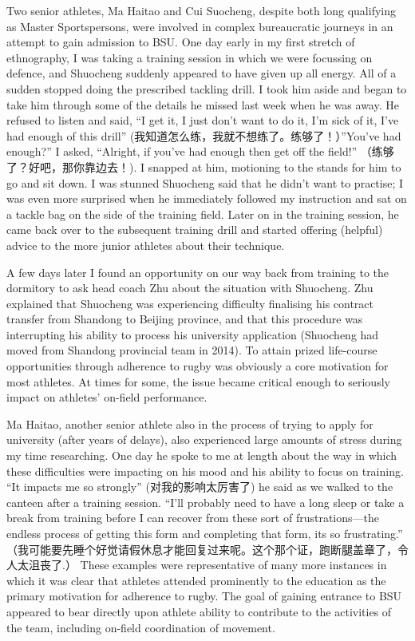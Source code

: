 \begin{CJK}{UTF8}{gbsn}
Two senior athletes, Ma Haitao and Cui Suocheng, despite both long qualifying as Master Sportspersons, were involved in complex bureaucratic journeys in an attempt to gain admission to BSU.  One day early in my first stretch of ethnography, I was taking a training session in which we were focussing on defence, and Shuocheng suddenly appeared to have given up all energy.  All of a sudden stopped doing the prescribed tackling drill.  I took him aside and began to take him through some of the details he missed last week when he was away.  He refused to listen and said, ``I get it, I just don't want to do it, I'm sick of it, I've had enough of this drill'' (我知道怎么练，我就不想练了。练够了！）''You've had enough?'' I asked, ``Alright, if you've had enough then get off the field!'' （练够了？好吧，那你靠边去！).  I snapped at him, motioning to the stands for him to go and sit down. I was stunned Shuocheng said that he didn't want to practise; I was even more surprised when he immediately followed my instruction and sat on a tackle bag on the side of the training field.  Later on in the training session, he came back over to the subsequent training drill and started offering (helpful) advice to the more junior athletes about their technique.

A few days later I found an opportunity on our way back from training to the dormitory to ask head coach Zhu about the situation with Shuocheng.  Zhu explained that Shuocheng was experiencing difficulty finalising his contract transfer from Shandong to Beijing province, and that this procedure was interrupting his ability to process his university application (Shuocheng had moved from Shandong provincial team in 2014). To attain prized life-course opportunities through adherence to rugby was obviously a core motivation for most athletes. At times for some, the issue became critical enough to seriously impact on athletes' on-field performance.

Ma Haitao, another senior athlete also in the process of trying to apply for university (after years of delays), also experienced large amounts of stress during my time researching.  One day he spoke to me at length about the way in which these difficulties were impacting on his mood and his ability to focus on training. ``It impacts me so strongly'' (对我的影响太厉害了) he said as we walked to the canteen after a training session. ``I'll probably need to have a long sleep or take a break from training before I can recover from these sort of frustrations---the endless process of getting this form and completing that form, its so frustrating.'' （我可能要先睡个好觉请假休息才能回复过来呢。这个那个证，跑断腿盖章了，令人太沮丧了.）  These examples were representative of many more instances in which it was clear that athletes attended prominently to the education as the primary motivation for adherence to rugby.  The goal of gaining entrance to BSU appeared to bear directly upon athlete ability to contribute to the activities of the team, including on-field coordination of movement.


\end{CJK}
